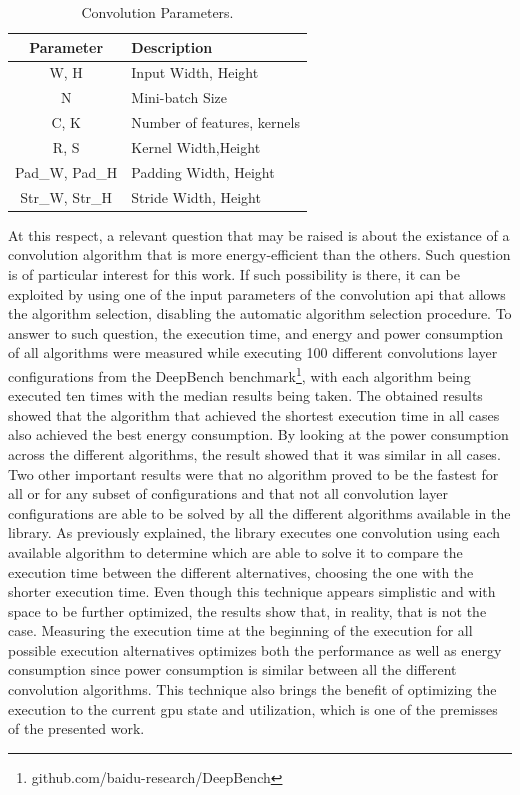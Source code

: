 \begin{table}[htbp]
\begin{center}
\begin{tabular}{cl}
\hline
\textbf{Parameter}&\textbf{Description} \\ 
\hline
W, H & Input Width, Height\\
N & Mini-batch Size \\
C, K & Number of features, kernels \\
R, S & Kernel Width,Height\\
Pad\_W, Pad\_H & Padding Width, Height \\
Str\_W, Str\_H & Stride Width, Height \\
\hline
\end{tabular}
\label{tab:convparams}
\end{center}

\caption{Convolution Parameters.}
\end{table}

At this respect, a relevant question that may be raised is about the existance of a convolution algorithm that is more energy-efficient than the others. Such question is of particular interest for this work. If such possibility is there, it can be exploited by using one of the input parameters of the convolution \acrshort{api} that allows the algorithm selection, disabling the automatic algorithm selection procedure. 
To answer to such question, the execution time, and energy and power consumption of all algorithms were measured while executing 100 different convolutions layer configurations from the DeepBench benchmark\footnote{github.com/baidu-research/DeepBench}, with each algorithm being executed ten times with the median results being taken. The obtained results showed that the algorithm that achieved the shortest execution time in all cases also achieved the best energy consumption. By looking at the power consumption across the different algorithms, the result showed that it was similar in all cases. Two other important results were that no algorithm proved to be the fastest for all or for any subset of configurations and 
that not all convolution layer configurations are able to be 
solved by all 
the different algorithms available in the library. 
As previously explained, the library executes one convolution using each available algorithm to determine which are able to solve it to compare the execution time between the different alternatives, choosing the one with the shorter execution time. Even though this technique appears simplistic and with space to be further optimized, the results show that, in reality, that is not the case. Measuring the execution time at the beginning of the execution for all possible execution alternatives optimizes both the performance as well as energy consumption since power consumption is similar between all the different convolution algorithms. This technique also brings the benefit of optimizing the execution to the current \acrshort{gpu} state and utilization, which is one of the premisses of the presented work.


